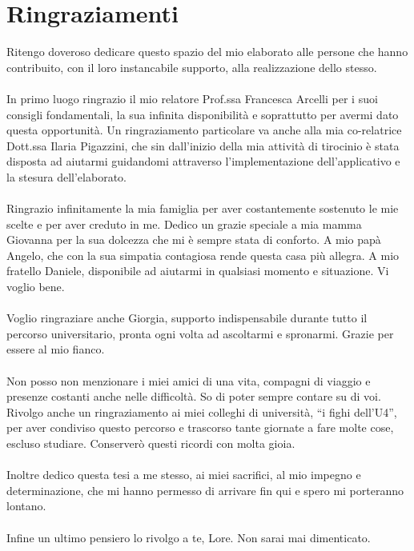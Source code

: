 \section*{Ringraziamenti}

Ritengo doveroso dedicare questo spazio del mio elaborato alle persone che hanno contribuito, con il loro instancabile supporto, alla realizzazione dello stesso. \\
\\
In primo luogo ringrazio il mio relatore Prof.ssa Francesca Arcelli per i suoi consigli fondamentali, la sua infinita disponibilità e soprattutto per avermi dato questa opportunità. Un ringraziamento particolare va anche alla mia co-relatrice Dott.ssa Ilaria Pigazzini, che sin dall’inizio della mia attività di tirocinio è stata disposta ad aiutarmi guidandomi attraverso l’implementazione dell’applicativo e la stesura dell’elaborato.\\
\\
Ringrazio infinitamente la mia famiglia per aver costantemente sostenuto le mie scelte e per aver creduto in me. Dedico un grazie speciale a mia mamma Giovanna per la sua dolcezza che mi è sempre stata di conforto. A mio papà Angelo, che con la sua simpatia contagiosa rende questa casa più allegra. A mio fratello Daniele, disponibile ad aiutarmi in qualsiasi momento e situazione. Vi voglio bene. \\
\\
Voglio ringraziare anche Giorgia, supporto indispensabile durante tutto il percorso universitario, pronta ogni volta ad ascoltarmi e spronarmi. Grazie per essere al mio fianco. \\
\\
Non posso non menzionare i miei amici di una vita, compagni di viaggio e presenze costanti anche nelle difficoltà.  So di poter sempre contare su di voi. Rivolgo anche un ringraziamento ai miei colleghi di università, “i fighi dell’U4”, per aver condiviso questo percorso e trascorso tante giornate a fare molte cose, escluso studiare. Conserverò questi ricordi con molta gioia. \\
\\
Inoltre dedico questa tesi a me stesso, ai miei sacrifici, al mio impegno e determinazione, che mi hanno permesso di arrivare fin qui e spero mi porteranno lontano. \\
\\
Infine un ultimo pensiero lo rivolgo a te, Lore. Non sarai mai dimenticato.